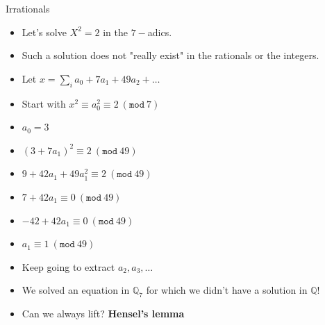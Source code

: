 \documentclass[8pt]{beamer}
\renewcommand{\mod}[1]{\left( \texttt{mod}~#1 \right)}
\newcommand{\Q}{\mathbb Q}
\begin{document}
\begin{frame}{Irrationals}
\begin{itemize}
\item Let's solve $X^2 = 2$ in the $7-$adics. \pause
\item Such a solution does not "really exist" in the rationals or the integers.\pause
\item Let $x = \sum_i a_0 + 7 a_1 + 49 a_2 + \dots$\pause
\item Start with $x^2 \equiv a_0^2 \equiv 2 ~\mod{7}$\pause
\item $a_0 = 3$
\item $(3 + 7a_1)^2 \equiv 2 ~\mod{49}$\pause
\item $9 + 42a_1 + 49a_1^2 \equiv 2 ~\mod{49}$\pause
\item $7 + 42a_1  \equiv 0 ~\mod{49}$\pause
\item $-42 + 42a_1  \equiv 0 ~\mod{49}$\pause
\item $a_1  \equiv 1 ~\mod{49}$\pause
\item Keep going to extract $a_2, a_3, \dots$\pause
\item We solved an equation in $\Q_7$ for which we didn't have a solution in $\Q$!\pause
\item Can we always lift? \textbf{Hensel's lemma}
\end{itemize}
\end{frame}
\end{document}
